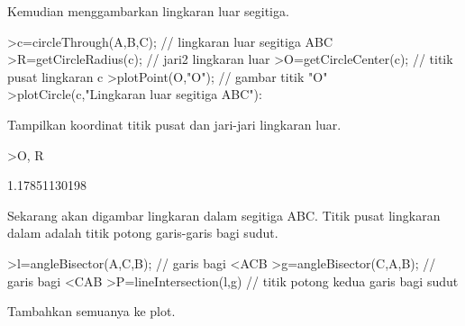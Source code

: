 \documentclass[a4paper,10pt]{article}
\begin{document}
\begin{eulernotebook}
\begin{eulercomment}
\begin{eulercomment}
\begin{eulercomment}
\begin{eulercomment}
\begin{eulercomment}
\begin{eulercomment}
\begin{eulercomment}
\begin{eulercomment}
\begin{eulercomment}
\begin{eulercomment}
\begin{eulercomment}
\begin{eulercomment}
\begin{eulercomment}
\begin{eulercomment}
\begin{eulercomment}
\begin{eulercomment}
\begin{eulercomment}
\begin{eulercomment}
\begin{eulercomment}
\begin{eulercomment}
\begin{eulercomment}
\begin{eulercomment}
\begin{eulercomment}
\begin{eulercomment}
\begin{eulercomment}
\begin{eulercomment}
\begin{eulercomment}
\begin{eulercomment}
\begin{eulercomment}
\begin{eulercomment}
\begin{eulercomment}
\begin{eulercomment}
\begin{eulercomment}
\begin{eulercomment}
\begin{eulercomment}
\begin{eulercomment}
\begin{eulercomment}
\begin{eulercomment}
\begin{euleroutput}
\end{euleroutput}
\begin{eulercomment}
Kemudian menggambarkan lingkaran luar segitiga.
\end{eulercomment}
\begin{eulerprompt}
>c=circleThrough(A,B,C); // lingkaran luar segitiga ABC
>R=getCircleRadius(c); // jari2 lingkaran luar 
>O=getCircleCenter(c); // titik pusat lingkaran c 
>plotPoint(O,"O"); // gambar titik "O"
>plotCircle(c,"Lingkaran luar segitiga ABC"):
\end{eulerprompt}
\begin{eulercomment}
Tampilkan koordinat titik pusat dan jari-jari lingkaran luar.
\end{eulercomment}
\begin{eulerprompt}
>O, R
\end{eulerprompt}
\begin{euleroutput}
  [1.16667,  1.16667]
  1.17851130198
\end{euleroutput}
\begin{eulercomment}
Sekarang akan digambar lingkaran dalam segitiga ABC. Titik pusat lingkaran dalam adalah
titik potong garis-garis bagi sudut.
\end{eulercomment}
\begin{eulerprompt}
>l=angleBisector(A,C,B); // garis bagi <ACB
>g=angleBisector(C,A,B); // garis bagi <CAB
>P=lineIntersection(l,g) // titik potong kedua garis bagi sudut
\end{eulerprompt}
\begin{euleroutput}
  [0.86038,  0.86038]
\end{euleroutput}
\begin{eulercomment}
Tambahkan semuanya ke plot.

\end{eulercomment}
\end{eulercomment}
\end{eulercomment}
\end{eulercomment}
\end{eulercomment}
\end{eulercomment}
\end{eulercomment}
\end{eulercomment}
\end{eulercomment}
\end{eulercomment}
\end{eulercomment}
\end{eulercomment}
\end{eulercomment}
\end{eulercomment}
\end{eulercomment}
\end{eulercomment}
\end{eulercomment}
\end{eulercomment}
\end{eulercomment}
\end{eulercomment}
\end{eulercomment}
\end{eulercomment}
\end{eulercomment}
\end{eulercomment}
\end{eulercomment}
\end{eulercomment}
\end{eulercomment}
\end{eulercomment}
\end{eulercomment}
\end{eulercomment}
\end{eulercomment}
\end{eulercomment}
\end{eulercomment}
\end{eulercomment}
\end{eulercomment}
\end{eulercomment}
\end{eulercomment}
\end{eulercomment}
\end{eulercomment}
\end{eulernotebook}
\end{document}
